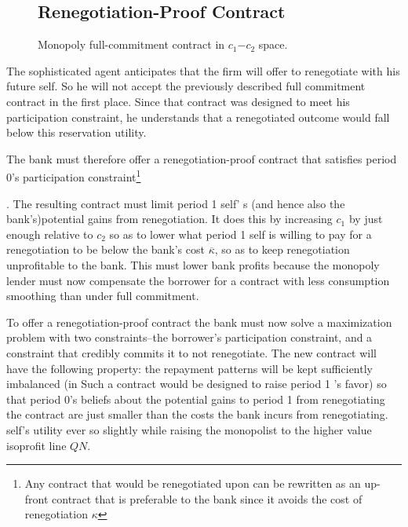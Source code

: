 \documentclass[11pt]{article}%
\providecommand{\DIFadd}[1]{{\protect\color{blue} \sf #1}} %
\providecommand{\DIFdel}[1]{{\protect\color{red} \scriptsize #1}} %
\providecommand{\DIFaddbegin}{} %
\providecommand{\DIFaddend}{} %
\providecommand{\DIFdelbegin}{} %
\providecommand{\DIFdelend}{} %
\providecommand{\DIFaddFL}[1]{\DIFadd{#1}} %
\providecommand{\DIFdelFL}[1]{\DIFdel{#1}} %
\providecommand{\DIFaddbeginFL}{} %
\providecommand{\DIFdelbeginFL}{} %
\providecommand{\DIFdelendFL}{} %
\begin{document}
\begin{figure}[ptb]
\DIFdelbeginFL \subsection{\DIFdelFL{Renegotiation-Proof Contract}}
\addtocounter{subsection}{-1}%
\DIFdelendFL \DIFaddbeginFL \caption{\label {\DIFaddFL{renegFig}}\DIFaddFL{Monopoly full-commitment contract in \(c_{1}\)\(-c_{2}\) space.}}
\end{figure}
\DIFaddend 


\DIFdelbegin \DIFdel{The sophisticated agent anticipates that the firm will offer to renegotiate
with his future self. So he will not accept the previously described full
commitment contract in the first place. Since that contract was designed to
meet his participation constraint, he understands that a renegotiated
outcome would fall below this reservation utility.
}%

\DIFdel{The bank must therefore offer a renegotiation-proof contract that satisfies
period 0's participation constraint}\footnote{%
\DIFdel{Any contract that would be renegotiated upon can be rewritten as an up-front
contract that is preferable to the bank since it avoids the cost of
renegotiation $\kappa $}}%
\addtocounter{footnote}{-1}%
\DIFdel{. The resulting contract must limit period 1 self' s
(and hence also the bank's)potential gains from renegotiation. It does this
by increasing $c_{1}$}%
\DIFdel{by just enough relative to $c_{2}$}%
\DIFdel{so as to lower
what period 1 self is willing to pay for a renegotiation to be below the
bank's cost $\overline{\kappa }$, so as to keep renegotiation unprofitable
to the bank. }%
\DIFdel{This must lower bank profits because the monopoly lender must
now compensate the borrower for a contract with less consumption smoothing
than under full commitment.
}%

\DIFdel{To offer a renegotiation-proof contract the bank must now solve a
maximization problem with two constraints--the borrower's participation
constraint, and a constraint that credibly commits it to not renegotiate.
The new contract will have the following property: the repayment patterns
will be kept sufficiently imbalanced (in }\DIFdelend \DIFaddbegin \DIFadd{Such a contract would be designed to raise }\DIFaddend period 1 \DIFdelbegin \DIFdel{'s favor) so that period
0's beliefs about the potential gains to period 1 from renegotiating the contract are just smaller than the costs the bank incurs from renegotiating.
}\DIFdelend \DIFaddbegin \DIFadd{self's utility ever so slightly while raising the monopolist to the higher value isoprofit line $QN$.  
}\DIFaddend 
\end{document}
